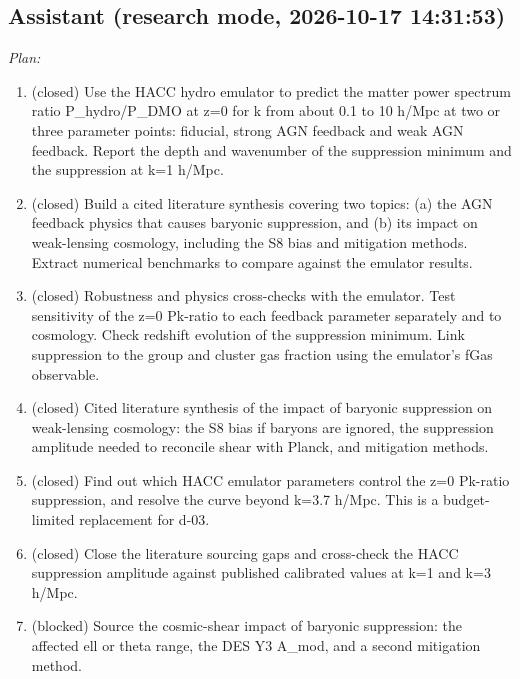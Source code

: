 \documentclass[11pt,a4paper]{article}
\begin{document}
\subsection*{Assistant \small(research mode, 2026-10-17 14:31:53)}
\textit{Plan:}\begin{enumerate}
  \item (closed) Use the HACC hydro emulator to predict the matter power spectrum ratio P\_hydro/P\_DMO at z=0 for k from about 0.1 to 10 h/Mpc at two or three parameter points: fiducial, strong AGN feedback and weak AGN feedback. Report the depth and wavenumber of the suppression minimum and the suppression at k=1 h/Mpc.
  \item (closed) Build a cited literature synthesis covering two topics: (a) the AGN feedback physics that causes baryonic suppression, and (b) its impact on weak-lensing cosmology, including the S8 bias and mitigation methods. Extract numerical benchmarks to compare against the emulator results.
  \item (closed) Robustness and physics cross-checks with the emulator. Test sensitivity of the z=0 Pk-ratio to each feedback parameter separately and to cosmology. Check redshift evolution of the suppression minimum. Link suppression to the group and cluster gas fraction using the emulator's fGas observable.
  \item (closed) Cited literature synthesis of the impact of baryonic suppression on weak-lensing cosmology: the S8 bias if baryons are ignored, the suppression amplitude needed to reconcile shear with Planck, and mitigation methods.
  \item (closed) Find out which HACC emulator parameters control the z=0 Pk-ratio suppression, and resolve the curve beyond k=3.7 h/Mpc. This is a budget-limited replacement for d-03.
  \item (closed) Close the literature sourcing gaps and cross-check the HACC suppression amplitude against published calibrated values at k=1 and k=3 h/Mpc.
  \item (blocked) Source the cosmic-shear impact of baryonic suppression: the affected ell or theta range, the DES Y3 A\_mod, and a second mitigation method.
\end{enumerate}
\end{document}
